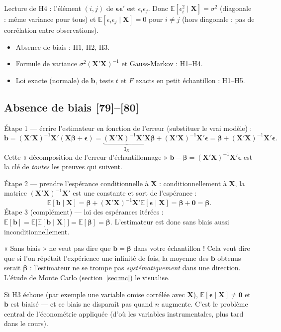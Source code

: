 \documentclass[11pt,a4paper]{article}
\newcommand{\vX}{\mathbf{X}}
\newcommand{\vb}{\mathbf{b}}
\newcommand{\vbeta}{\bm{\beta}}
\newcommand{\veps}{\bm{\epsilon}}
\newcommand{\I}{\mathbf{I}}
\newcommand{\XtX}{\vX'\vX}
\newcommand{\XtXi}{(\vX'\vX)^{-1}}
\newcommand{\E}{\mathbb{E}}
\begin{document}
Lecture de H4 : l'élément $(i,j)$ de $\veps\veps'$ est $\epsilon_i\epsilon_j$. Donc $\E[\epsilon_i^2\mid\vX]=\sigma^2$ (diagonale : même variance pour tous) et $\E[\epsilon_i\epsilon_j\mid\vX]=0$ pour $i\ne j$ (hors diagonale : pas de corrélation entre observations).

\begin{resultat}
\begin{itemize}[nosep]
\item Absence de biais : H1, H2, H3.
\item Formule de variance $\sigma^2\XtXi$ et Gauss-Markov : H1--H4.
\item Loi exacte (normale) de $\vb$, tests $t$ et $F$ exacts en petit échantillon : H1--H5.
\end{itemize}
\end{resultat}

\subsection{Absence de biais [79]--[80]}
\begin{detail}
Étape 1 — écrire l'estimateur en fonction de l'erreur (substituer le vrai modèle) :
\[
\vb=\XtXi\vX'(\vX\vbeta+\veps)=\underbrace{\XtXi\XtX}_{\I_K}\vbeta+\XtXi\vX'\veps=\vbeta+\XtXi\vX'\veps .
\]
Cette « décomposition de l'erreur d'échantillonnage » $\vb-\vbeta=\XtXi\vX'\veps$ est la clé de \emph{toutes} les preuves qui suivent.

Étape 2 — prendre l'espérance conditionnelle à $\vX$ : conditionnellement à $\vX$, la matrice $\XtXi\vX'$ est une constante et sort de l'espérance :
\[
\E[\vb\mid\vX]=\vbeta+\XtXi\vX'\E[\veps\mid\vX]=\vbeta+\mathbf 0=\vbeta .
\]
Étape 3 (complément) — loi des espérances itérées : $\E[\vb]=\E\big[\E[\vb\mid\vX]\big]=\E[\vbeta]=\vbeta$. L'estimateur est donc sans biais aussi inconditionnellement.
\end{detail}

\begin{intuition}
« Sans biais » ne veut pas dire que $\vb=\vbeta$ dans votre échantillon ! Cela veut dire que si l'on répétait l'expérience une infinité de fois, la moyenne des $\vb$ obtenus serait $\vbeta$ : l'estimateur ne se trompe pas \emph{systématiquement} dans une direction. L'étude de Monte Carlo (section~\ref{sec:mc}) le visualise.
\end{intuition}

\begin{attention}
Si H3 échoue (par exemple une variable omise corrélée avec $\vX$), $\E[\veps\mid\vX]\ne\mathbf 0$ et $\vb$ est biaisé — et ce biais ne disparaît pas quand $n$ augmente. C'est le problème central de l'économétrie appliquée (d'où les variables instrumentales, plus tard dans le cours).
\end{attention}
\end{document}
